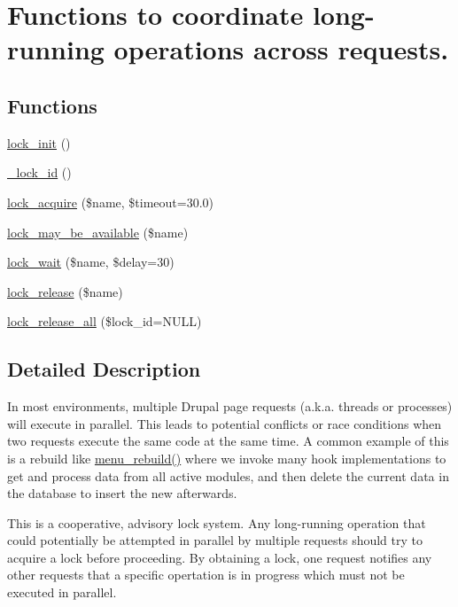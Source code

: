 \hypertarget{group__lock}{
\section{Functions to coordinate long-running operations across requests.}
\label{group__lock}
}
\subsection*{Functions}
\begin{CompactItemize}
\item 
\hyperlink{group__lock_g0d77cf7fc006fdcf8965ae2b682f90b9}{lock\_\-init} ()
\item 
\hyperlink{group__lock_g22f64c6b65bc54d5f8f981559b0cdf04}{\_\-lock\_\-id} ()
\item 
\hyperlink{group__lock_gc67a4b1061491f7a869646f47b66e998}{lock\_\-acquire} (\$name, \$timeout=30.0)
\item 
\hyperlink{group__lock_g095b65838e63b109f52ff6d8c00d8963}{lock\_\-may\_\-be\_\-available} (\$name)
\item 
\hyperlink{group__lock_g54c2ee771edac47614b8f12d949d3376}{lock\_\-wait} (\$name, \$delay=30)
\item 
\hyperlink{group__lock_g73e1456861f9aff1a506a650f43aceb0}{lock\_\-release} (\$name)
\item 
\hyperlink{group__lock_g290817e14e2a9ecc0bd34c6b7b0af031}{lock\_\-release\_\-all} (\$lock\_\-id=NULL)
\end{CompactItemize}


\subsection{Detailed Description}
In most environments, multiple Drupal page requests (a.k.a. threads or processes) will execute in parallel. This leads to potential conflicts or race conditions when two requests execute the same code at the same time. A common example of this is a rebuild like \hyperlink{group__menu_gf36dcb9d5491ef5e7d2cf22c1f5c69f4}{menu\_\-rebuild()} where we invoke many hook implementations to get and process data from all active modules, and then delete the current data in the database to insert the new afterwards.

This is a cooperative, advisory lock system. Any long-running operation that could potentially be attempted in parallel by multiple requests should try to acquire a lock before proceeding. By obtaining a lock, one request notifies any other requests that a specific opertation is in progress which must not be executed in parallel.

